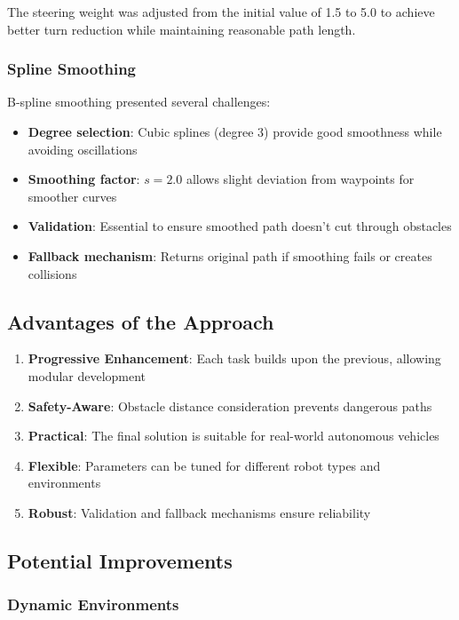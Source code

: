 \documentclass[aps,letterpaper,10pt]{revtex4}
\begin{document}
The steering weight was adjusted from the initial value of 1.5 to 5.0 to achieve better turn reduction while maintaining reasonable path length.

\subsubsection{Spline Smoothing}

B-spline smoothing presented several challenges:

\begin{itemize}
    \item \textbf{Degree selection}: Cubic splines (degree 3) provide good smoothness while avoiding oscillations
    \item \textbf{Smoothing factor}: $s = 2.0$ allows slight deviation from waypoints for smoother curves
    \item \textbf{Validation}: Essential to ensure smoothed path doesn't cut through obstacles
    \item \textbf{Fallback mechanism}: Returns original path if smoothing fails or creates collisions
\end{itemize}

\subsection{Advantages of the Approach}

\begin{enumerate}
    \item \textbf{Progressive Enhancement}: Each task builds upon the previous, allowing modular development
    \item \textbf{Safety-Aware}: Obstacle distance consideration prevents dangerous paths
    \item \textbf{Practical}: The final solution is suitable for real-world autonomous vehicles
    \item \textbf{Flexible}: Parameters can be tuned for different robot types and environments
    \item \textbf{Robust}: Validation and fallback mechanisms ensure reliability
\end{enumerate}

\subsection{Potential Improvements}

\subsubsection{Dynamic Environments}
\end{document}
